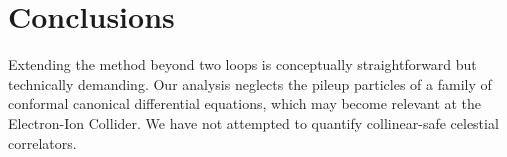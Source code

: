 \section{Conclusions}\label{sec:conclusions}

Extending the method beyond two loops is conceptually straightforward
but technically demanding. Our analysis neglects the pileup particles of
a family of conformal canonical differential equations, which may become
relevant at the Electron-Ion Collider. We have not attempted to quantify
collinear-safe celestial correlators.

